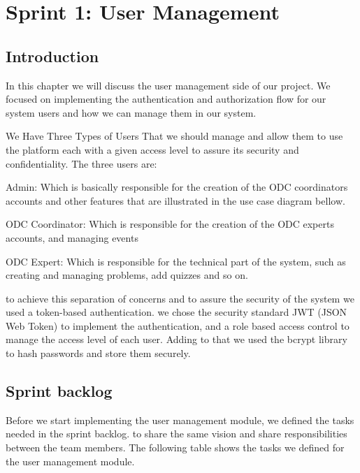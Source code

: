 \chapter{Sprint 1: User Management}

\section{Introduction}
In this chapter we will discuss the user management side of our project.
We focused on implementing the authentication and authorization
flow for our system users and how we can manage them in our system.

We Have Three Types of Users That we should manage and allow them to use the platform
each with a given access level to assure its security and confidentiality. The three users are:

Admin: Which is basically responsible for the creation of the ODC coordinators accounts
and other features that are illustrated in the use case diagram bellow.

ODC Coordinator: Which is responsible for the creation of the ODC experts accounts, and managing events

ODC Expert: Which is responsible for the technical part of the system, such as creating and managing problems,
add quizzes and so on.

to achieve this separation of concerns and to assure the security of the system we used a token-based authentication.
we chose the security standard JWT (JSON Web Token) to implement the authentication, and a role based access control
to manage the access level of each user. Adding to that we used the bcrypt library to hash passwords and store them securely.

\section{Sprint backlog}
Before we start implementing the user management module, we defined the tasks needed in the sprint backlog.
to share the same vision and share responsibilities between the team members. The following table shows the tasks
we defined for the user management module.


